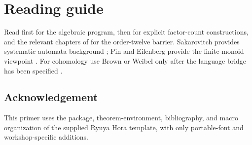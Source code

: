 \documentclass{amsart}
\begin{document}
\section{Reading guide}

Read \cite{pinStraubingTherien1992} first for the algebraic program, then \cite{bourneRuskuc2016} for explicit factor-count constructions, and the relevant chapters of \cite{bourne2017counting} for the order-twelve barrier.  Sakarovitch provides systematic automata background \cite{sakarovitch2009elements}; Pin and Eilenberg provide the finite-monoid viewpoint \cite{pin1986varieties,eilenberg1976automataA}.  For cohomology use Brown or Weibel only after the language bridge has been specified \cite{brown1982cohomology,weibel1994homological}.

\subsection*{Acknowledgement}

This primer uses the package, theorem-environment, bibliography, and macro organization of the supplied Ryuya Hora  template, with only portable-font and workshop-specific additions.

\printbibliography
\end{document}
